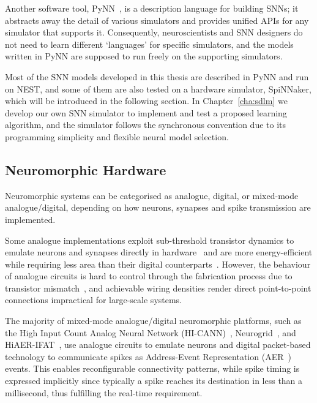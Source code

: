 Another software tool, PyNN~\citep{davison2008pynn}, is a description language for building SNNs;
it abstracts away the detail of various simulators and provides unified APIs for any simulator that supports it.
Consequently, neuroscientists and SNN designers do not need to learn different `languages' for specific simulators, and the models written in PyNN are supposed to run freely on the supporting simulators.

Most of the SNN models developed in this thesis are described in PyNN and run on NEST, and some of them are also tested on a hardware simulator, SpiNNaker, which will be introduced in the following section.
In Chapter~\ref{cha:sdlm} we develop our own SNN simulator to implement and test a proposed learning algorithm, and the simulator follows the synchronous convention due to its programming simplicity and flexible neural model selection. 

\subsection{Neuromorphic Hardware}
\label{subsec:neuromorphic_hw}
Neuromorphic systems can be categorised as analogue, digital, or mixed-mode analogue/digital, depending on how neurons, synapses and spike transmission are implemented. %

Some analogue implementations exploit sub-threshold transistor dynamics to emulate neurons and synapses directly in hardware~\citep{indiveri2011neuromorphic} and are more energy-efficient while requiring less area than their digital counterparts~\citep{joubert2012hardware}.
However, the behaviour of analogue circuits is hard to control through the fabrication process due to transistor mismatch~\citep{indiveri2011neuromorphic,pedram2006thermal,linares2003compact}, and achievable wiring densities render direct point-to-point connections impractical for large-scale systems.

The majority of mixed-mode analogue/digital neuromorphic platforms, such as the High Input Count Analog Neural Network (HI-CANN)~\citep{schemmel2010wafer}, Neurogrid~\citep{benjamin2014neurogrid}, and HiAER-IFAT~\citep{yu201265k}, use analogue circuits to emulate neurons and digital packet-based technology to communicate spikes as Address-Event Representation (AER~\citep{lazzaro1995multi}) events.
This enables reconfigurable connectivity patterns, while spike timing is expressed implicitly since typically a spike reaches its destination in less than a millisecond, thus fulfilling the real-time requirement.

